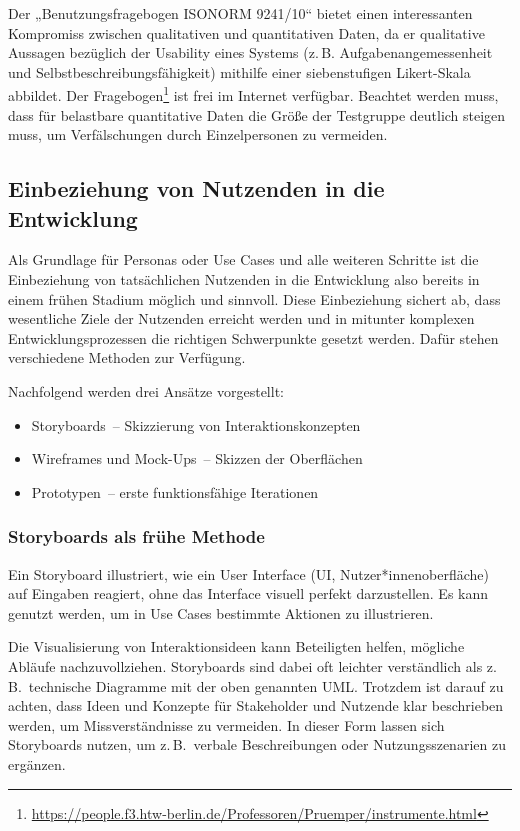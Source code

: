 \documentclass[
  11pt,
  letterpaper,
  DIV=11,
  twoside]{scrreprt}
\DeclareRobustCommand{\href}[2]{#2\footnote{\url{#1}}}
\begin{document}
Der „Benutzungsfragebogen ISONORM 9241/10`` bietet einen interessanten
Kompromiss zwischen qualitativen und quantitativen Daten, da er
qualitative Aussagen bezüglich der Usability eines Systems (z.\,B.
Aufgabenangemessenheit und Selbstbeschreibungsfähigkeit) mithilfe einer
siebenstufigen Likert-Skala abbildet. Der
\href{https://people.f3.htw-berlin.de/Professoren/Pruemper/instrumente.html}{Fragebogen}
ist frei im Internet verfügbar. Beachtet werden muss, dass für
belastbare quantitative Daten die Größe der Testgruppe deutlich steigen
muss, um Verfälschungen durch Einzelpersonen zu vermeiden.

\subsection{Einbeziehung von Nutzenden in die
Entwicklung}\label{einbeziehung-von-nutzenden-in-die-entwicklung}

Als Grundlage für Personas oder Use Cases und alle weiteren Schritte ist
die Einbeziehung von tatsächlichen Nutzenden in die Entwicklung also
bereits in einem frühen Stadium möglich und sinnvoll. Diese Einbeziehung
sichert ab, dass wesentliche Ziele der Nutzenden erreicht werden und in
mitunter komplexen Entwicklungsprozessen die richtigen Schwerpunkte
gesetzt werden. Dafür stehen verschiedene Methoden zur Verfügung.

Nachfolgend werden drei Ansätze vorgestellt:

\begin{itemize}
\item
  Storyboards~-- Skizzierung von Interaktionskonzepten
\item
  Wireframes und Mock-Ups~-- Skizzen der Oberflächen
\item
  Prototypen~-- erste funktionsfähige Iterationen
\end{itemize}

\subsubsection{Storyboards als frühe
Methode}\label{storyboards-als-fruxfche-methode}

Ein Storyboard illustriert, wie ein User Interface (UI,
Nutzer*innenoberfläche) auf Eingaben reagiert, ohne das Interface
visuell perfekt darzustellen. Es kann genutzt werden, um in Use Cases
bestimmte Aktionen zu illustrieren.

Die Visualisierung von Interaktionsideen kann Beteiligten helfen,
mögliche Abläufe nachzuvollziehen. Storyboards sind dabei oft leichter
verständlich als z.\,B.~technische Diagramme mit der oben genannten UML.
Trotzdem ist darauf zu achten, dass Ideen und Konzepte für Stakeholder
und Nutzende klar beschrieben werden, um Missverständnisse zu vermeiden.
In dieser Form lassen sich Storyboards nutzen, um z.\,B.~verbale
Beschreibungen oder Nutzungsszenarien zu ergänzen.
\end{document}
